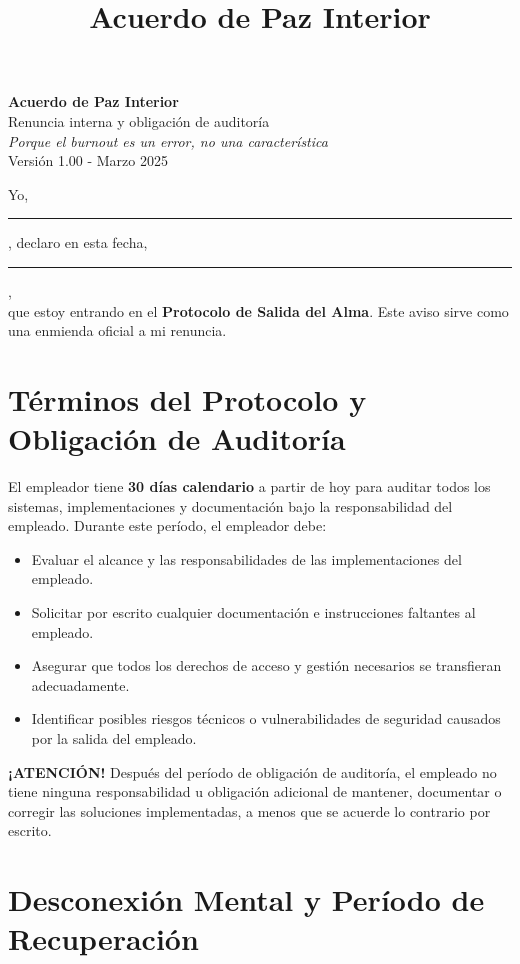 \documentclass[a4paper,11pt]{article}
\title{Acuerdo de Paz Interior}
\date{}
\begin{document}
\pagestyle{empty}

\begin{center}
    {\LARGE \textbf{Acuerdo de Paz Interior}}\\[1em]
    {\large Renuncia interna y obligación de auditoría}\\[0.5em]
    \textit{Porque el burnout es un error, no una característica}\\[0.5em]
    {\small Versión 1.00 - Marzo 2025}
\end{center}

\vspace{2em}

Yo, \rule{7cm}{0.2pt}, declaro en esta fecha, \rule{4cm}{0.2pt},\\
que estoy entrando en el \textbf{Protocolo de Salida del Alma}. Este aviso sirve como una enmienda oficial a mi renuncia.

\section*{Términos del Protocolo y Obligación de Auditoría}

El empleador tiene \textbf{30 días calendario} a partir de hoy para auditar todos los sistemas, implementaciones y documentación bajo la responsabilidad del empleado. Durante este período, el empleador debe:

\begin{itemize}
    \item Evaluar el alcance y las responsabilidades de las implementaciones del empleado.
    \item Solicitar por escrito cualquier documentación e instrucciones faltantes al empleado.
    \item Asegurar que todos los derechos de acceso y gestión necesarios se transfieran adecuadamente.
    \item Identificar posibles riesgos técnicos o vulnerabilidades de seguridad causados por la salida del empleado.
\end{itemize}

\textbf{¡ATENCIÓN!} Después del período de obligación de auditoría, el empleado no tiene ninguna responsabilidad u obligación adicional de mantener, documentar o corregir las soluciones implementadas, a menos que se acuerde lo contrario por escrito.

\section*{Desconexión Mental y Período de Recuperación}
\end{document}
